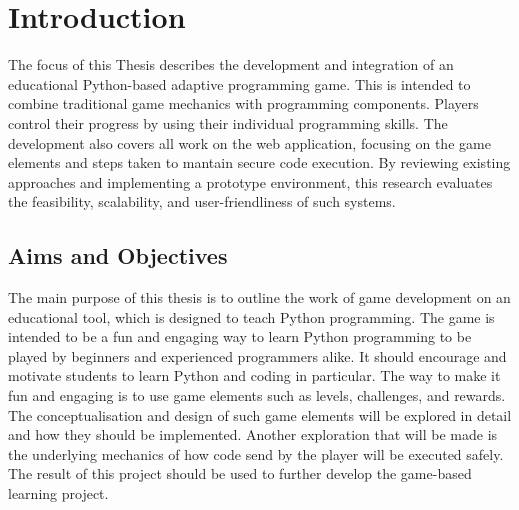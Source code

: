 \section{Introduction}
The focus of this Thesis describes the development and integration of an educational Python-based adaptive programming game. This is intended to combine traditional game mechanics with programming components. Players control their progress by using their individual programming skills. The development also covers all work on the web application, focusing on the game elements and steps taken to mantain secure code execution. By reviewing existing approaches and implementing a prototype environment, this research evaluates the feasibility, scalability, and user-friendliness of such systems.

\subsection{Aims and Objectives} 
The main purpose of this thesis is to outline the work of game development on an educational tool, which is designed to teach Python programming. The game is intended to be a fun and engaging way to learn Python programming to be played by beginners and experienced programmers alike.  It should encourage and motivate students to learn Python and coding in particular. The way to make it fun and engaging is to use game elements such as levels, challenges, and rewards. The conceptualisation and design of such game elements will be explored in detail and how they should be implemented. Another exploration that will be made is the underlying mechanics of how code send by the player will be executed safely. The result of this project should be used to further develop the game-based learning project. 